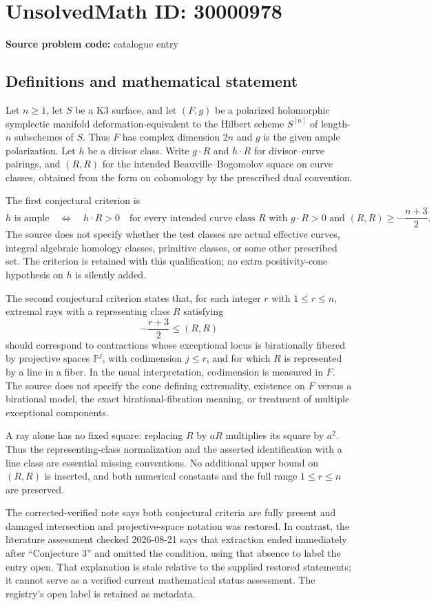 \documentclass[11pt]{article}
\begin{document}
\section*{UnsolvedMath ID: 30000978}
\textbf{Source problem code:} catalogue entry
\subsection{Definitions and mathematical statement}
Let $n\geq1$, let $S$ be a K3 surface, and let $(F,g)$ be a polarized holomorphic symplectic manifold deformation-equivalent to the Hilbert scheme $S^{[n]}$ of length-$n$ subschemes of $S$. Thus $F$ has complex dimension $2n$ and $g$ is the given ample polarization. Let $h$ be a divisor class. Write $g\cdot R$ and $h\cdot R$ for divisor--curve pairings, and $(R,R)$ for the intended Beauville--Bogomolov square on curve classes, obtained from the form on cohomology by the prescribed dual convention.

The first conjectural criterion is
\[
h\text{ is ample}
\quad\Longleftrightarrow\quad
h\cdot R>0\quad\text{for every intended curve class }R
\text{ with }g\cdot R>0\text{ and }(R,R)\geq-\frac{n+3}{2}.
\]
The source does not specify whether the test classes are actual effective curves, integral algebraic homology classes, primitive classes, or some other prescribed set. The criterion is retained with this qualification; no extra positivity-cone hypothesis on $h$ is silently added.

The second conjectural criterion states that, for each integer $r$ with $1\leq r\leq n$, extremal rays with a representing class $R$ satisfying
\[
-\frac{r+3}{2}\leq(R,R)
\]
should correspond to contractions whose exceptional locus is birationally fibered by projective spaces $\mathbb P^j$, with codimension $j\leq r$, and for which $R$ is represented by a line in a fiber. In the usual interpretation, codimension is measured in $F$. The source does not specify the cone defining extremality, existence on $F$ versus a birational model, the exact birational-fibration meaning, or treatment of multiple exceptional components.

A ray alone has no fixed square: replacing $R$ by $aR$ multiplies its square by $a^2$. Thus the representing-class normalization and the asserted identification with a line class are essential missing conventions. No additional upper bound on $(R,R)$ is inserted, and both numerical constants and the full range $1\leq r\leq n$ are preserved.

The corrected-verified note says both conjectural criteria are fully present and damaged intersection and projective-space notation was restored. In contrast, the literature assessment checked 2026-08-21 says that extraction ended immediately after ``Conjecture 3'' and omitted the condition, using that absence to label the entry open. That explanation is stale relative to the supplied restored statements; it cannot serve as a verified current mathematical status assessment. The registry's open label is retained as metadata.
\end{document}

